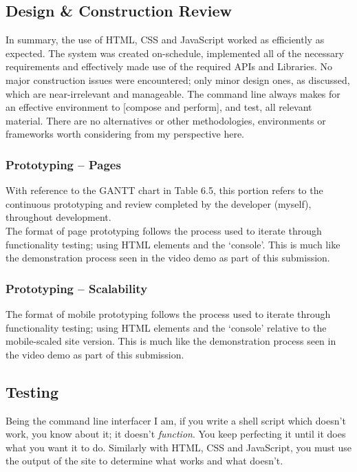 \documentclass[11pt, english]{article}
\begin{document}
\newpage

	\subsection{Design \& Construction Review}

	In summary, the use of HTML, CSS and JavaScript worked as efficiently as expected. The system was created on-schedule, implemented all of the necessary requirements and effectively made use of the required APIs and Libraries. No major construction issues were encountered; only minor design ones, as discussed, which are near-irrelevant and manageable. The command line always makes for an effective environment to [compose and perform], and test, all relevant material. There are no alternatives or other methodologies, environments or frameworks worth considering from my perspective here.

		\subsubsection{Prototyping -- Pages}

	With reference to the GANTT chart in Table 6.5, this portion refers to the continuous prototyping and review completed by the developer (myself), throughout development.\\

	The format of page prototyping follows the process used to iterate through functionality testing; using HTML elements and the `console'. This is much like the demonstration process seen in the video demo as part of this submission.

		\subsubsection{Prototyping -- Scalability}

	The format of mobile prototyping follows the process used to iterate through functionality testing; using HTML elements and the `console' relative to the mobile-scaled site version. This is much like the demonstration process seen in the video demo as part of this submission.

	\subsection{Testing}

	Being the command line interfacer I am, if you write a shell script which doesn't work, you know about it; it doesn't \textit{function}. You keep perfecting it until it does what you want it to do. Similarly with HTML, CSS and JavaScript, you must use the output of the site to determine what works and what doesn't.
\end{document}
